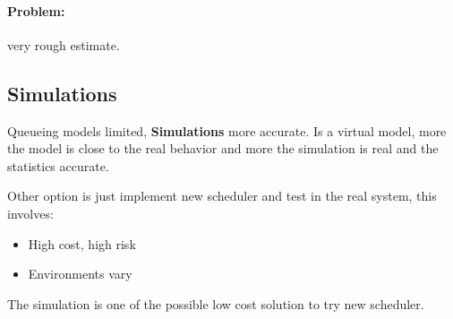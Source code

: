 \newpage
\paragraph{Problem: }very rough estimate.

\subsection{Simulations}

Queueing models limited, \textbf{Simulations} more accurate. Is a virtual model, more the model is close to the real behavior and more the simulation is real and the statistics accurate.

Other option is just implement new scheduler and test in the real system, this involves:

\begin{itemize}
    \item High cost, high risk
    \item Environments vary
\end{itemize}

The simulation is one of the possible low cost solution to try new scheduler.
